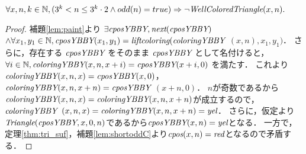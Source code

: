 \begin{lem}[\ShortOdd] \label{lem:shortodd}
  $\forall x, n, k \in \mathbb{N},
  (3^k < n \leq 3^k \cdot 2 \land odd(n) = true) \Rightarrow \lnot\textit{WellColoredTriangle}(x,n).$
\end{lem}
\begin{proof}
  補題\ref{lem:paint}より
  $\exists \textit{cposYBBY}, \textit{next}(\textit{cposYBBY})$ $ \land \forall x_1, y_1 \in \mathbb{N}, \textit{cposYBBY}(x_1,y_1) = \textit{liftcoloring}(\textit{coloringYBBY}$ $(x,n),x_1,y_1)$．
  さらに，存在する $\textit{cposYBBY}$ をそのまま $\textit{cposYBBY}$ として名付けると，
  $\forall i \in \mathbb{N}, \textit{coloringYBBY}(x,n,x+i) = \textit{cposYBBY}(x+i,0)$ を満たす．
  これより$\textit{coloringYBBY}(x,n,x) = \textit{cposYBBY}(x,0)$，$\textit{coloringYBBY}(x,n,x+n) = \textit{cposYBBY}$ $(x+n,0)$．
  $n$が奇数であるから$\textit{coloringYBBY}(x,n,x)=\textit{coloringYBBY}(x,n,x+n)$が成立するので，
  $\textit{coloringYBBY}$ $(x,n,x)=\textit{coloringYBBY}(x,n,x+n)=\textit{yel}$．
  さらに，仮定より$\textit{Triangle}(\textit{cposYBBY},x,0,n)$であるから$\textit{cposYBBY}(x,n)=\textit{yel}$となる．
  一方で，定理\ref{thm:tri_suf}，補題\ref{lem:shortoddC}より$\textit{cpos}(x,n)=\textit{red}$となるので矛盾する．
\end{proof}


